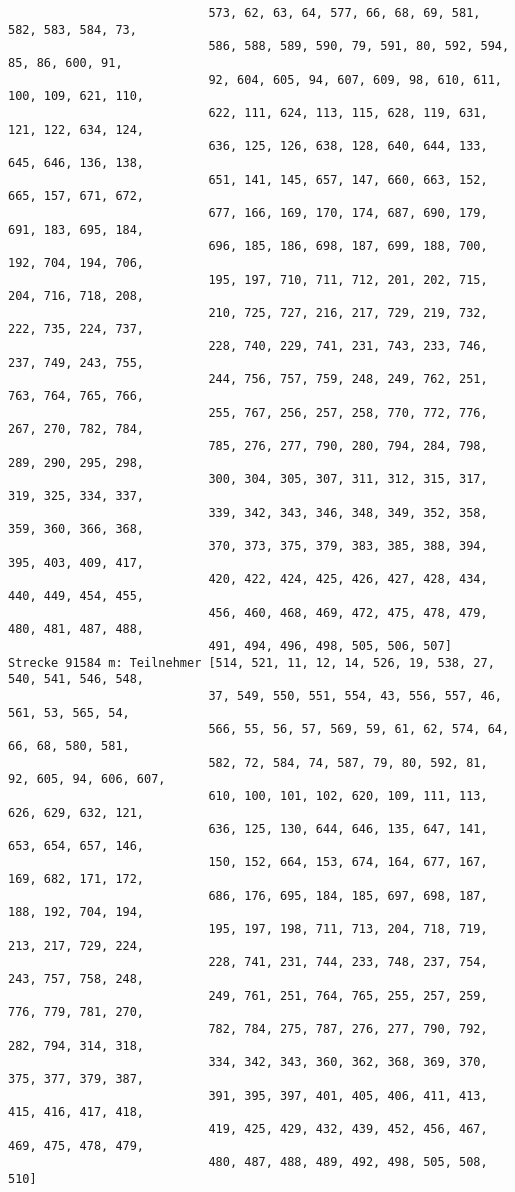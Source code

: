 \documentclass[a4paper,10pt,ngerman]{scrartcl}
\begin{document}
\begin{itemize}
\begin{verbatim}
                            573, 62, 63, 64, 577, 66, 68, 69, 581, 582, 583, 584, 73, 
                            586, 588, 589, 590, 79, 591, 80, 592, 594, 85, 86, 600, 91, 
                            92, 604, 605, 94, 607, 609, 98, 610, 611, 100, 109, 621, 110, 
                            622, 111, 624, 113, 115, 628, 119, 631, 121, 122, 634, 124, 
                            636, 125, 126, 638, 128, 640, 644, 133, 645, 646, 136, 138, 
                            651, 141, 145, 657, 147, 660, 663, 152, 665, 157, 671, 672, 
                            677, 166, 169, 170, 174, 687, 690, 179, 691, 183, 695, 184, 
                            696, 185, 186, 698, 187, 699, 188, 700, 192, 704, 194, 706, 
                            195, 197, 710, 711, 712, 201, 202, 715, 204, 716, 718, 208, 
                            210, 725, 727, 216, 217, 729, 219, 732, 222, 735, 224, 737, 
                            228, 740, 229, 741, 231, 743, 233, 746, 237, 749, 243, 755, 
                            244, 756, 757, 759, 248, 249, 762, 251, 763, 764, 765, 766, 
                            255, 767, 256, 257, 258, 770, 772, 776, 267, 270, 782, 784, 
                            785, 276, 277, 790, 280, 794, 284, 798, 289, 290, 295, 298, 
                            300, 304, 305, 307, 311, 312, 315, 317, 319, 325, 334, 337, 
                            339, 342, 343, 346, 348, 349, 352, 358, 359, 360, 366, 368, 
                            370, 373, 375, 379, 383, 385, 388, 394, 395, 403, 409, 417, 
                            420, 422, 424, 425, 426, 427, 428, 434, 440, 449, 454, 455, 
                            456, 460, 468, 469, 472, 475, 478, 479, 480, 481, 487, 488, 
                            491, 494, 496, 498, 505, 506, 507]
Strecke 91584 m: Teilnehmer [514, 521, 11, 12, 14, 526, 19, 538, 27, 540, 541, 546, 548, 
                            37, 549, 550, 551, 554, 43, 556, 557, 46, 561, 53, 565, 54, 
                            566, 55, 56, 57, 569, 59, 61, 62, 574, 64, 66, 68, 580, 581, 
                            582, 72, 584, 74, 587, 79, 80, 592, 81, 92, 605, 94, 606, 607, 
                            610, 100, 101, 102, 620, 109, 111, 113, 626, 629, 632, 121, 
                            636, 125, 130, 644, 646, 135, 647, 141, 653, 654, 657, 146, 
                            150, 152, 664, 153, 674, 164, 677, 167, 169, 682, 171, 172, 
                            686, 176, 695, 184, 185, 697, 698, 187, 188, 192, 704, 194, 
                            195, 197, 198, 711, 713, 204, 718, 719, 213, 217, 729, 224, 
                            228, 741, 231, 744, 233, 748, 237, 754, 243, 757, 758, 248, 
                            249, 761, 251, 764, 765, 255, 257, 259, 776, 779, 781, 270, 
                            782, 784, 275, 787, 276, 277, 790, 792, 282, 794, 314, 318, 
                            334, 342, 343, 360, 362, 368, 369, 370, 375, 377, 379, 387, 
                            391, 395, 397, 401, 405, 406, 411, 413, 415, 416, 417, 418, 
                            419, 425, 429, 432, 439, 452, 456, 467, 469, 475, 478, 479, 
                            480, 487, 488, 489, 492, 498, 505, 508, 510]
  \end{verbatim}
  

\end{itemize}
\end{document}
